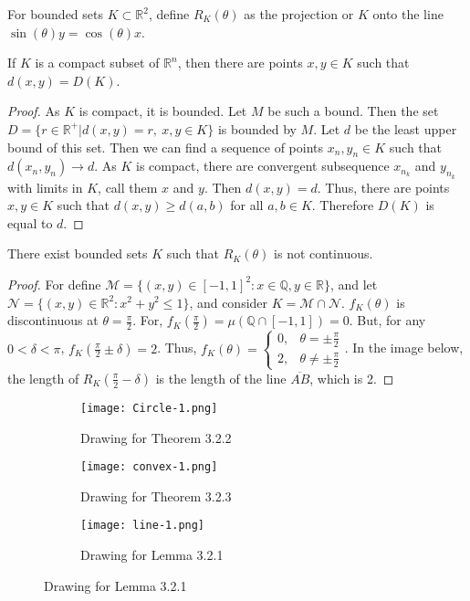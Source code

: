 \documentclass[crop=false,class=article,oneside]{standalone}
\begin{document}
        \begin{notation}
        For bounded sets $K\subset \mathbb{R}^2$, define $R_K(\theta)$ as the projection or $K$ onto the line $\sin(\theta)y=\cos(\theta)x$.
        \end{notation}
        \begin{theorem}
        If $K$ is a compact subset of $\mathbb{R}^n$, then there are points $x,y\in K$ such that $d(x,y)=D(K)$.
        \end{theorem}
        \begin{proof}
        As $K$ is compact, it is bounded. Let $M$ be such a bound. Then the set $D=\{r\in \mathbb{R}^+| d(x,y) = r,\ x,y\in K\}$ is bounded by $M$. Let $d$ be the least upper bound of this set. Then we can find a sequence of points $x_n,y_n\in K$ such that $d(x_n,y_n) \rightarrow d$. As $K$ is compact, there are convergent subsequence $x_{n_k}$ and $y_{n_k}$ with limits in $K$, call them $x$ and $y$. Then $d(x,y) = d$. Thus, there are points $x,y\in K$ such that $d(x,y) \geq d(a,b)$ for all $a,b\in K$. Therefore $D(K)$ is equal to $d$.
        \end{proof}
        \begin{theorem}
        There exist bounded sets $K$ such that $R_K(\theta)$ is not continuous.
        \end{theorem}
        \begin{proof}
        For define $\mathcal{M} = \{(x,y)\in [-1,1]^2: x\in \mathbb{Q},y\in \mathbb{R}\}$, and let $\mathcal{N} = \{(x,y)\in \mathbb{R}^2: x^2+y^2\leq 1\}$, and consider $K = \mathcal{M}\cap \mathcal{N}$. $f_{K}(\theta)$ is discontinuous at $\theta = \frac{\pi}{2}$. For, $f_K(\frac{\pi}{2}) = \mu(\mathbb{Q}\cap [-1,1])=0$. But, for any $0<\delta < \pi$, $f_K(\frac{\pi}{2}\pm\delta) = 2$. Thus, $f_K(\theta) = \begin{cases} 0, & \theta = \pm \frac{\pi}{2} \\ 2, & \theta \ne \pm \frac{\pi}{2}\end{cases}$. In the image below, the length of $R_K(\frac{\pi}{2}-\delta)$ is the length of the line $\overline{AB}$, which is 2.
        \end{proof}
        \begin{figure}[H]
          \begin{subfigure}[b]{0.32\textwidth}
             \centering
            \texttt{[image: Circle-1.png]}
            \caption{Drawing for Theorem 3.2.2}
          \end{subfigure}
          \begin{subfigure}[b]{0.32\textwidth}
            \centering
            \texttt{[image: convex-1.png]}
            \caption{Drawing for Theorem 3.2.3}
          \end{subfigure}
          \begin{subfigure}[b]{0.32\textwidth}
            \centering
            \texttt{[image: line-1.png]}
            \caption{Drawing for Lemma 3.2.1}
          \end{subfigure}  
        \end{figure}
\end{document}
